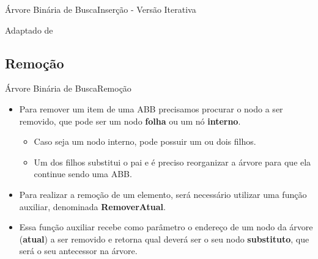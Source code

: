 \documentclass[aspectratio=169]{beamer}
\begin{document}
\begin{frame}{Árvore Binária de Busca}{Inserção - Versão Iterativa}

\tiny{Adaptado de \cite{Backes2016}}  
\end{frame}


\subsection{Remoção}

\begin{frame}{Árvore Binária de Busca}{Remoção}
\begin{itemize}
 \item Para remover um item de uma ABB precisamos procurar o nodo a ser removido, que pode ser um nodo {\bf folha} ou um nó {\bf interno}.
 \begin{itemize}
 \item Caso seja um nodo interno, pode possuir um ou dois filhos.
 \item Um dos filhos substitui o pai e é preciso reorganizar a árvore para que ela continue sendo uma ABB.
 \end{itemize}
 \item Para realizar a remoção de um elemento, será necessário utilizar uma função auxiliar, denominada {\bf RemoverAtual}. 
 \item Essa função auxiliar recebe como parâmetro o endereço de um nodo da árvore ({\bf atual}) a ser removido e retorna qual deverá ser o seu nodo {\bf substituto}, que será o seu antecessor na árvore.
\end{itemize}
\end{frame}
\end{document}
